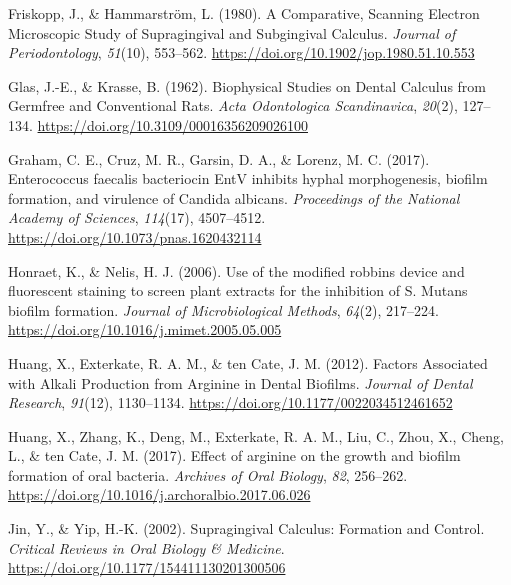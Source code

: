 \documentclass[
  b5paper,
]{book}
\newlength{\cslhangindent}
\newlength{\cslentryspacingunit} %
\newenvironment{CSLReferences}[2] %
 {%
  \setlength{\parindent}{0pt}
  \ifodd #1
  \let\oldpar\par
  \def\par{\hangindent=\cslhangindent\oldpar}
  \fi
  \setlength{\parskip}{#2\cslentryspacingunit}
 }%
 {}
\begin{document}
\begin{CSLReferences}{1}{0}
\leavevmode{}%
Friskopp, J., \& Hammarström, L. (1980). A {Comparative}, {Scanning
Electron Microscopic Study} of {Supragingival} and {Subgingival
Calculus}. \emph{Journal of Periodontology}, \emph{51}(10), 553--562.
\url{https://doi.org/10.1902/jop.1980.51.10.553}

\leavevmode{}%
Glas, J.-E., \& Krasse, B. (1962). Biophysical {Studies} on {Dental
Calculus} from {Germfree} and {Conventional Rats}. \emph{Acta
Odontologica Scandinavica}, \emph{20}(2), 127--134.
\url{https://doi.org/10.3109/00016356209026100}

\leavevmode{}%
Graham, C. E., Cruz, M. R., Garsin, D. A., \& Lorenz, M. C. (2017).
Enterococcus faecalis bacteriocin {EntV} inhibits hyphal morphogenesis,
biofilm formation, and virulence of {Candida} albicans.
\emph{Proceedings of the National Academy of Sciences}, \emph{114}(17),
4507--4512. \url{https://doi.org/10.1073/pnas.1620432114}

\leavevmode{}%
Honraet, K., \& Nelis, H. J. (2006). Use of the modified robbins device
and fluorescent staining to screen plant extracts for the inhibition of
{S}. Mutans biofilm formation. \emph{Journal of Microbiological
Methods}, \emph{64}(2), 217--224.
\url{https://doi.org/10.1016/j.mimet.2005.05.005}

\leavevmode{}%
Huang, X., Exterkate, R. A. M., \& ten Cate, J. M. (2012). Factors
{Associated} with {Alkali Production} from {Arginine} in {Dental
Biofilms}. \emph{Journal of Dental Research}, \emph{91}(12), 1130--1134.
\url{https://doi.org/10.1177/0022034512461652}

\leavevmode{}%
Huang, X., Zhang, K., Deng, M., Exterkate, R. A. M., Liu, C., Zhou, X.,
Cheng, L., \& ten Cate, J. M. (2017). Effect of arginine on the growth
and biofilm formation of oral bacteria. \emph{Archives of Oral Biology},
\emph{82}, 256--262.
\url{https://doi.org/10.1016/j.archoralbio.2017.06.026}

\leavevmode{}%
Jin, Y., \& Yip, H.-K. (2002). Supragingival {Calculus}: {Formation} and
{Control}. \emph{Critical Reviews in Oral Biology \& Medicine}.
\url{https://doi.org/10.1177/154411130201300506}


\end{CSLReferences}
\end{document}

